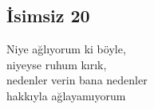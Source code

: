 \subsection{İsimsiz 20}

Niye ağlıyorum ki böyle, \\
niyeyse ruhum kırık, \\
nedenler verin bana nedenler \\
hakkıyla ağlayamıyorum \\